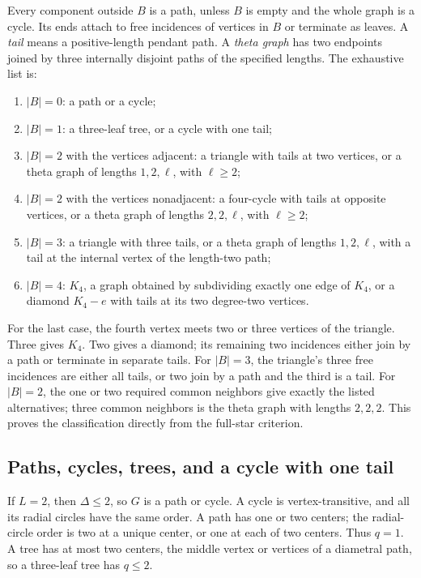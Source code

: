 \documentclass[11pt,a4paper]{article}
\theoremstyle{definition}\newtheorem{definition}[theorem]{Definition}
\theoremstyle{remark}\newtheorem{remark}[theorem]{Remark}
\begin{document}
Every component outside $B$ is a path, unless $B$ is empty and the whole
graph is a cycle. Its ends attach to free incidences of vertices in $B$
or terminate as leaves. A \emph{tail} means a positive-length pendant
path. A \emph{theta graph} has two endpoints joined by three internally
disjoint paths of the specified lengths. The exhaustive list is:
\begin{enumerate}
\item $|B|=0$: a path or a cycle;
\item $|B|=1$: a three-leaf tree, or a cycle with one tail;
\item $|B|=2$ with the vertices adjacent: a triangle with tails at two
vertices, or a theta graph of lengths $1,2,\ell$, with $\ell\ge2$;
\item $|B|=2$ with the vertices nonadjacent: a four-cycle with tails at
opposite vertices, or a theta graph of lengths $2,2,\ell$, with
$\ell\ge2$;
\item $|B|=3$: a triangle with three tails, or a theta graph of lengths
$1,2,\ell$, with a tail at the internal vertex of the length-two path;
\item $|B|=4$: $K_4$, a graph obtained by subdividing exactly one edge
of $K_4$, or a diamond $K_4-e$ with tails at its two degree-two vertices.
\end{enumerate}
For the last case, the fourth vertex meets two or three vertices of the
triangle. Three gives $K_4$. Two gives a diamond; its remaining two
incidences either join by a path or terminate in separate tails.
For $|B|=3$, the triangle's three free incidences are either all tails,
or two join by a path and the third is a tail. For $|B|=2$, the one or
two required common neighbors give exactly the listed alternatives;
three common neighbors is the theta graph with lengths $2,2,2$.
This proves the classification directly from the full-star criterion.

\subsection{Paths, cycles, trees, and a cycle with one tail}
If $L=2$, then $\Delta\le2$, so $G$ is a path or cycle. A cycle is
vertex-transitive, and all its radial circles have the same order.
A path has one or two centers; the radial-circle order is two at a
unique center, or one at each of two centers. Thus $q=1$.
A tree has at most two centers, the middle vertex or vertices of a
diametral path, so a three-leaf tree has $q\le2$.
\end{document}
